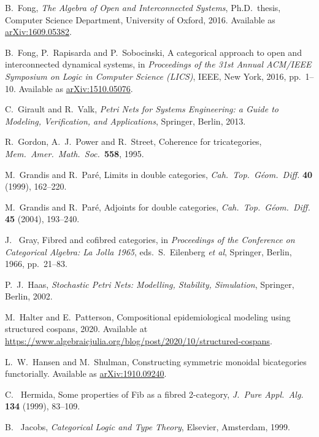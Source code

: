 \documentclass[reqno]{amsart}
\begin{document}
\begin{thebibliography}{100}
 B.\ Fong, \textsl{The Algebra of Open and Interconnected Systems},
Ph.D.\ thesis, Computer Science Department, University of Oxford, 2016.
Available as \href{https://arxiv.org/abs/1609.05382}{arXiv:1609.05382}.

 B.\ Fong, P.\ Rapisarda and P.\ Sobocinski, A categorical approach to open and interconnected dynamical systems, in \textsl{Proceedings of the 31st Annual ACM/IEEE Symposium on Logic in Computer Science (LICS)}, IEEE, New York, 2016, pp.\ 1--10.  Available as \href{http://arxiv.org/abs/510.05076}{arXiv:1510.05076}.

 C.\ Girault and R.\ Valk, \textsl{Petri Nets for Systems Engineering: a Guide to Modeling, Verification, and Applications}, Springer, Berlin, 2013.

 R.\ Gordon, A.\ J.\ Power and R.\ Street, Coherence for tricategories, \textsl{Mem.\ Amer.\ Math.\ Soc.\ }\textbf{558}, 1995.

 M.\ Grandis and R.\ Par\'e, Limits in double categories, \textsl{Cah.\ Top.\ G\'eom.\ Diff.} \textbf{40} (1999), 162--220.

 M.\ Grandis and R.\ Par\'e, Adjoints for double categories, 
 \textsl{Cah.\ Top.\ G\'eom.\ Diff.} \textbf{45} (2004), 193--240.

 J. \ Gray, Fibred and cofibred categories, in \textsl{Proceedings of the Conference on Categorical Algebra: La Jolla 1965}, eds.\ S.\ Eilenberg \textit{et al}, Springer, Berlin, 1966, pp.\ 21--83.

 P.\ J.\ Haas, \textsl{Stochastic Petri Nets: Modelling, Stability, Simulation},
Springer, Berlin, 2002.

 M.\ Halter and E.\ Patterson, Compositional epidemiological modeling using structured cospans, 2020.  Available at \href{https://www.algebraicjulia.org/blog/post/2020/10/structured-cospans}{https://www.algebraicjulia.org/blog/post/2020/10/structured-cospans}.

  L.\ W.\ Hansen and M.\ Shulman, Constructing symmetric monoidal bicategories functorially.  Available as \href{https://arxiv.org/abs/1910.09240}{arXiv:1910.09240}.

 C. \ Hermida, Some properties of Fib as a fibred 2-category, \textsl{J.\ Pure Appl.\ Alg.\ } \textbf{134} (1999), 83--109.

 B. \ Jacobs, \textsl{Categorical Logic and Type Theory}, Elsevier, Amsterdam, 1999.


\end{thebibliography}
\end{document}
